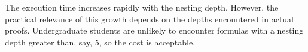 \documentclass{jflart}
\begin{document}
The execution time increases rapidly with the nesting depth. However, the practical relevance of this growth depends on the depths encountered in actual proofs. Undergraduate students are unlikely to encounter formulas with a nesting depth greater than, say, 5, so the cost is acceptable.








\end{document}
